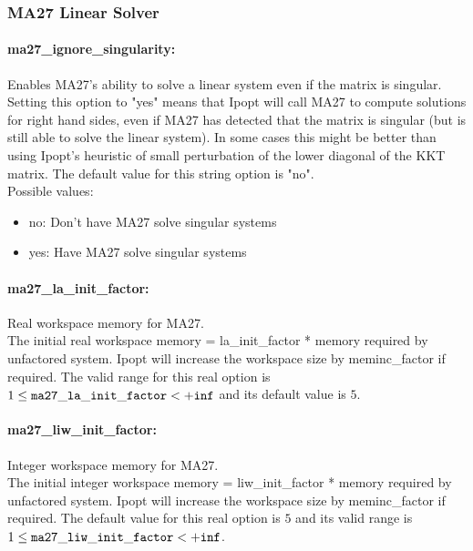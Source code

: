 \subsubsection{MA27 Linear Solver}
\label{sec:MA27_Linear_Solver}

\paragraph{ma27\_ignore\_singularity:}\label{sec:ma27_ignore_singularity} Enables MA27's ability to solve a linear system even if the matrix is singular. $\;$ \\
 Setting this option to "yes" means that Ipopt
will call MA27 to compute solutions for right
hand sides, even if MA27 has detected that the
matrix is singular (but is still able to solve
the linear system). In some cases this might be
better than using Ipopt's heuristic of small
perturbation of the lower diagonal of the KKT
matrix.
The default value for this string option is "no".
\\ 
Possible values:
\begin{itemize}
   \item no: Don't have MA27 solve singular systems
   \item yes: Have MA27 solve singular systems
\end{itemize}

\paragraph{ma27\_la\_init\_factor:}\label{sec:ma27_la_init_factor} Real workspace memory for MA27. $\;$ \\
 The initial real workspace memory =
la\_init\_factor * memory required by unfactored
system. Ipopt will increase the workspace size by
meminc\_factor if required. The valid range for this real option is 
$1 \le {\tt ma27\_la\_init\_factor } <  {\tt +inf}$
and its default value is $5$.


\paragraph{ma27\_liw\_init\_factor:}\label{sec:ma27_liw_init_factor} Integer workspace memory for MA27. $\;$ \\
 The initial integer workspace memory =
liw\_init\_factor * memory required by unfactored
system. Ipopt will increase the workspace size by
meminc\_factor if required.  The default value for this real option is $5$ and its valid range is
$1 \le {\tt ma27\_liw\_init\_factor } <  {\tt +inf}$.


